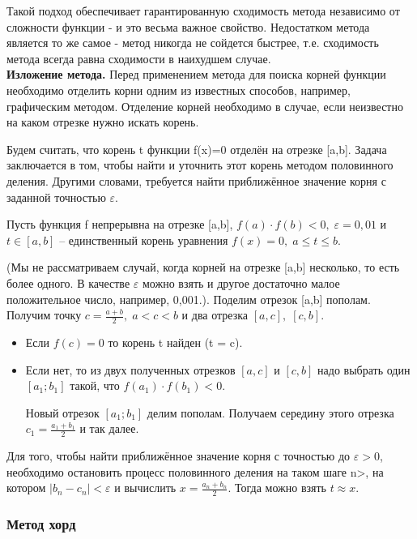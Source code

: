 \documentclass{article}
\begin{document}
				Такой подход обеспечивает гарантированную сходимость метода независимо от сложности функции - и это весьма важное свойство. Недостатком метода является то же самое - метод никогда не сойдется быстрее, т.е. сходимость метода всегда равна сходимости в наихудшем случае.\\
				
				\textbf{Изложение метода.}
				Перед применением метода для поиска корней функции необходимо отделить корни одним из известных способов, например, графическим методом. Отделение корней необходимо в случае, если неизвестно на каком отрезке нужно искать корень.

				Будем считать, что корень t функции f(x)=0 отделён на отрезке [a,b]. Задача заключается в том, чтобы найти и уточнить этот корень методом половинного деления. Другими словами, требуется найти приближённое значение корня с заданной точностью $\varepsilon$.
		
			Пусть функция f непрерывна на отрезке [a,b], $f(a)\cdot f(b)<0, \; \varepsilon=0,01$ и $t\in[a,b]$ -- единственный корень уравнения $f(x)=0, \; a\le t\le b$.
		
			(Мы не рассматриваем случай, когда корней на отрезке [a,b] несколько, то есть более одного. В качестве $\varepsilon$ можно взять и другое достаточно малое положительное число, например, 0,001.).
			Поделим отрезок [a,b] пополам. Получим точку $c= \frac {a+b}{2}, \; a<c<b$ и два отрезка $[a,c], \; [c,b]$.
			
			\begin{itemize}
				\item 
				Если $f(c)=0$ то корень  t найден (t = c). 
				\item 
				Если нет, то из двух полученных отрезков $[a,c]$ и $[c,b]$ надо выбрать один $[a_1;b_1]$ такой, что $f(a_1)\cdot f(b_1)<0$.
				
				Новый отрезок $[a_1;b_1]$ делим пополам. Получаем середину этого отрезка $c_1=\frac {a_1+b_1}{2}$ и так далее.
			
			\end{itemize}
			
			Для того, чтобы найти приближённое значение корня с точностью до $\varepsilon > 0$, необходимо остановить процесс половинного деления на таком шаге n>, на котором $|b_n-c_n|<\varepsilon$ и вычислить $x=\frac {a_n+b_n}{2}$. Тогда можно взять $t\approx x$.
			
			\subsubsection{Метод хорд}
			
\end{document}
